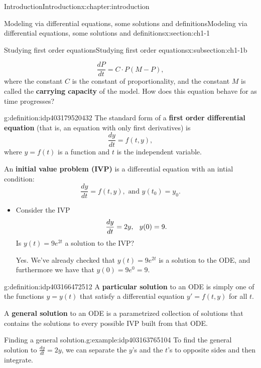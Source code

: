 \documentclass[oneside,10pt,]{book}
\newcommand{\terminology}[1]{\textbf{#1}}
\numberwithin{equation}{section}
\numberwithin{equation}{section}
\begin{document}
\begin{chapterptx}{Introduction}{}{Introduction}{}{}{x:chapter:introduction}
\begin{sectionptx}{Modeling via differential equations, some solutions and definitions}{}{Modeling via differential equations, some solutions and definitions}{}{}{x:section:ch1-1}
\begin{subsectionptx}{Studying first order equations}{}{Studying first order equations}{}{}{x:subsection:ch1-1b}
\begin{itemize}[label=\textbullet]
\begin{equation*}
\frac{dP}{dt} = C \cdot P(M - P),
\end{equation*}
where the constant \(C\) is the constant of proportionality, and the constant \(M\) is called the \terminology{carrying capacity} of the model. How does this equation behave for as time progresses?%
\end{itemize}
\begin{definition}{}{g:definition:idp403179520432}%
The standard form of a \terminology{first order differential equation} (that is, an equation with only first derivatives) is%
\begin{equation*}
\frac{dy}{dt} = f(t,y),
\end{equation*}
where \(y = f(t)\) is a function and \(t\) is the independent variable.%
\par
An \terminology{initial value problem (IVP)} is a differential equation with an intial condition:%
\begin{equation*}
\frac{dy}{dt} = f(t, y), \text{ and } y(t_0) = y_0.
\end{equation*}
%
\end{definition}
%
\begin{itemize}[label=\textbullet]
\item{}Consider the IVP%
\begin{equation*}
\frac{dy}{dt} = 2y, \hspace{.1in} y(0) =9.
\end{equation*}
Is \(y(t) = 9e^{2t}\) a solution to the IVP?%
\par
Yes. We've already checked that \(y(t) = 9e^{2t}\) is a solution to the ODE, and furthermore we have that \(y(0) = 9e^{0} = 9\).%
\end{itemize}
\begin{definition}{}{g:definition:idp403166472512}%
A \terminology{particular solution} to an ODE is simply one of the functions \(y = y(t)\) that satisfy a differential equation \(y' = f(t,y)\) for all \(t\).%
\par
A \terminology{general solution} to an ODE is a parametrized collection of solutions that contains the solutions to every possible IVP built from that ODE.%
\end{definition}
\begin{example}{Finding a general solution.}{g:example:idp403163765104}%
 To find the general solution to \(\frac{dy}{dt} = 2y\), we can separate the \(y\)'s and the \(t\)'s to opposite sides and then integrate.%
\begin{align*}

\end{align*}
\end{example}
\end{subsectionptx}
\end{sectionptx}
\end{chapterptx}
\end{document}
